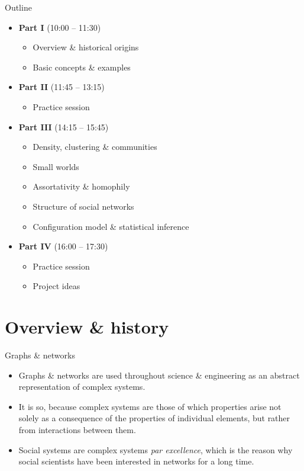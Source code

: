 \documentclass[
    hyperref={colorlinks,linkcolor=blue,urlcolor=blue,citecolor=blue}
]{beamer}
\begin{document}
\begin{frame}{Outline}
\small
\begin{itemize}
    \item<2-> \textbf{Part I} (10:00 -- 11:30)
    \begin{itemize}
        \item Overview \& historical origins
        \item Basic concepts \& examples
    \end{itemize}
    \item<3-> \textbf{Part II} (11:45 -- 13:15)
    \begin{itemize}
        \item Practice session
    \end{itemize}
    \item<4-> \textbf{Part III} (14:15 -- 15:45)
    \begin{itemize}
        \item Density, clustering \& communities
        \item Small worlds
        \item Assortativity \& homophily
        \item Structure of social networks
        \item Configuration model \& statistical inference
    \end{itemize}
    \item<5-> \textbf{Part IV} (16:00 -- 17:30)
    \begin{itemize}
        \item Practice session
        \item Project ideas
    \end{itemize}
\end{itemize}
\end{frame}

\section[Graphs and networks]{Overview \& history}

\begin{frame}{Graphs \& networks}
\begin{itemize}
    \item<2-> Graphs \& networks are used throughout science \& engineering
    as an abstract representation of complex systems.
    \item<3-> It is so, because complex systems are those of which properties
    arise not solely as a consequence of the properties of individual elements,
    but rather from interactions between them.
    \item<4-> Social systems are complex systems \textit{par excellence},
    which is the reason why social scientists have been interested in
    networks for a long time.
\end{itemize}
\end{frame}
\end{document}
